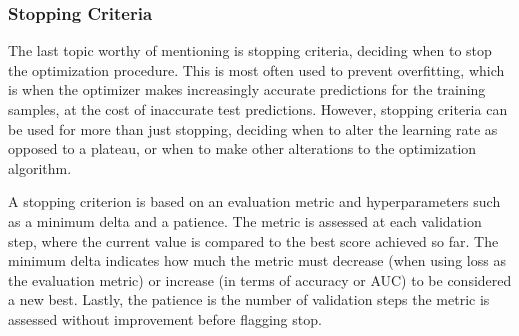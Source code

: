     \subsubsection{Stopping Criteria}
    
        The last topic worthy of mentioning is stopping criteria, deciding when to stop the optimization procedure. This is most often used to prevent overfitting, which is when the optimizer makes increasingly accurate predictions for the training samples, at the cost of inaccurate test predictions. However, stopping criteria can be used for more than just stopping, deciding when to alter the learning rate as opposed to a plateau, or when to make other alterations to the optimization algorithm. 
        
        A stopping criterion is based on an evaluation metric and hyperparameters such as a minimum delta and a patience. The metric is assessed at each validation step, where the current value is compared to the best score achieved so far. The minimum delta indicates how much the metric must decrease (when using loss as the evaluation metric) or increase (in terms of accuracy or AUC) to be considered a new best. Lastly, the patience is the number of validation steps the metric is assessed without improvement before flagging stop.

